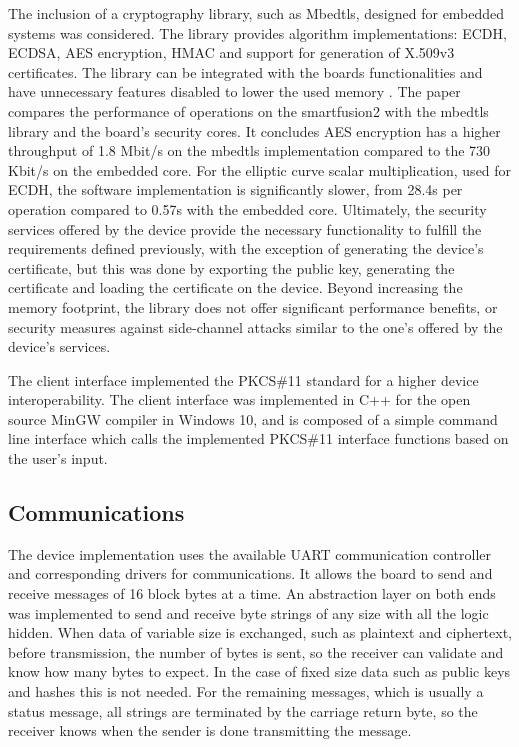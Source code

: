 The inclusion of a cryptography library, such as Mbedtls, designed for embedded systems was considered. The library provides algorithm implementations: ECDH, ECDSA, AES encryption, HMAC and support for generation of X.509v3 certificates. The library can be integrated with the boards functionalities and have unnecessary features disabled to lower the used memory \cite{parrinha2017flexible}.
The paper compares the performance of operations on the smartfusion2 with the mbedtls library and the board's security cores. It concludes AES encryption has a higher throughput of 1.8 Mbit/s on the mbedtls implementation compared to the 730 Kbit/s on the embedded core. For the elliptic curve scalar multiplication, used for ECDH, the software implementation is significantly slower, from 28.4s per operation compared to 0.57s with the embedded core.
Ultimately, the security services offered by the device provide the necessary functionality to fulfill the requirements defined previously, with the exception of generating the device's certificate, but this was done by exporting the public key, generating the certificate and loading the certificate on the device.
Beyond increasing the memory footprint, the library does not offer significant performance benefits, or security measures against side-channel attacks similar to the one's offered by the device's services.

The client interface implemented the \ac{PKCS}\#11 standard for a higher device interoperability. The client interface was implemented in C++ for the open source MinGW compiler in Windows 10, and is composed of a simple command line interface which calls the implemented \ac{PKCS}\#11 interface functions based on the user's input.

\subsection{Communications}\label{chap:implementation:app:comms}

The device implementation uses the available \ac{UART} communication controller and corresponding drivers for communications.
It allows the board to send and receive messages of 16 block bytes at a time.
An abstraction layer on both ends was implemented to send and receive byte strings of any size with all the logic hidden.
When data of variable size is exchanged, such as plaintext and ciphertext, before transmission, the number of bytes is sent, so the receiver can validate and know how many bytes to expect.
In the case of fixed size data such as public keys and hashes this is not needed. For the remaining messages, which is usually a status message, all strings are terminated by the carriage return byte, so the receiver knows when the sender is done transmitting the message.

